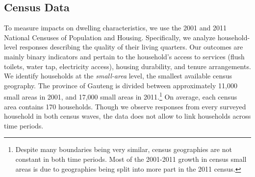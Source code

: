 \documentclass[12pt]{article}
\begin{document}
\subsection{Census Data}

To measure impacts on dwelling characteristics, we use the 2001 and 2011 National Censuses of Population and Housing. Specifically, we analyze household-level responses describing the quality of their living quarters. Our outcomes are mainly binary indicators and pertain to the household's access to services (flush toilets, water tap, electricity access), housing durability, and tenure arrangements. We identify households at the {\it small-area} level, the smallest available census geography. The province of Gauteng is divided between approximately 11,000 small areas in 2001, and 17,000 small areas in 2011.\footnote{Despite many boundaries being very similar, census geographies are not constant in both time periods. Most of the 2001-2011 growth in census small areas is due to geographies being split into more part in the 2011 census.} On average, each census area contains 170 households. Though we observe responses from every surveyed household in both census waves, the data does not allow to link households across time periods. 
\end{document}
